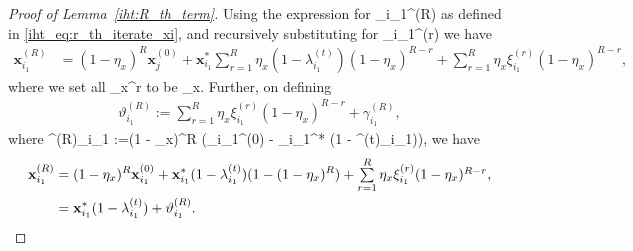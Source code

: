 \documentclass{article}
\def\[#1\]{{$#1$}}
\def\b#1{{\mathbf{#1}}}
\begin{document}
\begin{proof}[Proof of Lemma~\ref{iht:R_th_term}]
	Using the expression for \[\b{x}_{i_1}^{(R)} \] as defined in \eqref{iht_eq:r_th_iterate_xi}, and recursively substituting for \[\b{x}_{i_1}^{(r)}\] we have
	\begin{align*}
	\b{x}_{i_1}^{(R)} 
	&=  (1 - \eta_{x})^{R} \b{x}_j^{(0)} + \b{x}_{i_1}^*\textstyle\sum\limits_{r = 1}^{R}\eta_{x}(1 - \lambda^{(t)}_{i_1}) (1- \eta_x)^{{R} - r} + \sum\limits_{r = 1}^{R }\eta_{x}\xi^{(r)}_{i_1} (1- \eta_x)^{{R} - r},
	\end{align*}
	where we set all \[\eta_x^{r}\] to be \[\eta_x\]. Further, on defining
	\begin{align}\label{eq:def_var_theta}
	\vartheta^{(R)}_{i_1} :=  \textstyle\sum\limits_{r = 1}^{R }\eta_{x}\xi^{(r)}_{i_1} (1- \eta_x)^{{R} - r} + \gamma^{(R)}_{i_1},
	\end{align}
	where \[ \gamma^{(R)}_{i_1} :=(1 - \eta_{x})^{R} (\b{x}_{i_1}^{(0)}  - \b{x}_{i_1}^* (1 - \lambda^{(t)}_{i_1}))\], we have	
	\begin{align}
	\b{x}_{i_1}^{(R)} 
	& =  (1 - \eta_{x})^{R} \b{x}_{i_1}^{(0)}  + \b{x}_{i_1}^* (1 - \lambda^{(t)}_{i_1}) ( 1- (1 - \eta_{x})^{R}) + \textstyle\sum\limits_{r = 1}^{R }\eta_{x}\xi^{(r)}_{i_1} (1- \eta_x)^{{R} - r},\notag\\
	& = \b{x}_{i_1}^* (1 - \lambda^{(t)}_{i_1}) + \vartheta^{(R)}_{i_1}.
	\end{align}









	
	
	
	
	
	
	
	
	
	
	
	
	
	
	
	
	
	
	
	
	
	
	
	
	
	
	
	
	
	
	
	
	
	
	
	
	
	
	
	
	
	

\end{proof}
\end{document}
